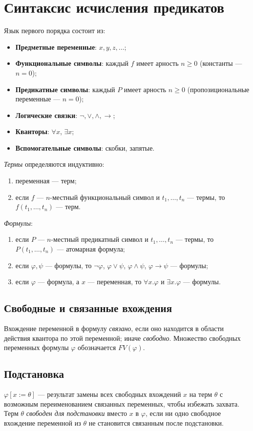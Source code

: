\documentclass[10pt]{article}
\begin{document}
\section{Синтаксис исчисления предикатов}
Язык первого порядка состоит из:
\begin{itemize}
  \item \textbf{Предметные переменные}: $x, y, z, \dots$;
  \item \textbf{Функциональные символы}: каждый $f$ имеет арность $n\ge 0$ (константы — $n=0$);
  \item \textbf{Предикатные символы}: каждый $P$ имеет арность $n\ge 0$ (пропозициональные переменные — $n=0$);
  \item \textbf{Логические связки}: $\neg, \vee, \wedge, \rightarrow$;
  \item \textbf{Кванторы}: $\forall x$, $\exists x$;
  \item \textbf{Вспомогательные символы}: скобки, запятые.
\end{itemize}
\textit{Термы} определяются индуктивно:
\begin{enumerate}
  \item переменная — терм;
  \item если $f$ — $n$-местный функциональный символ и $t_1,\dots,t_n$ — термы, то $f(t_1,\dots,t_n)$ — терм.
\end{enumerate}
\textit{Формулы}:
\begin{enumerate}
  \item если $P$ — $n$-местный предикатный символ и $t_1,\dots,t_n$ — термы, то $P(t_1,\dots,t_n)$ — атомарная формула;
  \item если $\varphi,\psi$ — формулы, то $\neg\varphi$, $\varphi\vee\psi$, $\varphi\wedge\psi$, $\varphi\rightarrow\psi$ — формулы;
  \item если $\varphi$ — формула, а $x$ — переменная, то $\forall x.\varphi$ и $\exists x.\varphi$ — формулы.
\end{enumerate}
\subsection{Свободные и связанные вхождения}
Вхождение переменной в формулу \textit{связано}, если оно находится в области действия квантора по этой переменной; иначе \textit{свободно}. Множество свободных переменных формулы $\varphi$ обозначается $FV(\varphi)$.
\subsection{Подстановка}
$\varphi[x:=\theta]$ — результат замены всех свободных вхождений $x$ на терм $\theta$ с возможным переименованием связанных переменных, чтобы избежать захвата. Терм $\theta$ \textit{свободен для подстановки} вместо $x$ в $\varphi$, если ни одно свободное вхождение переменной из $\theta$ не становится связанным после подстановки.
\end{document}
